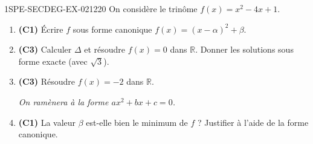 \begin{exercice}{1SPE-SECDEG-EX-021}{2}{20}
On considère le trinôme $f(x) = x^2 - 4x + 1$.

\begin{enumerate}
  \item \textbf{(C1)} Écrire $f$ sous forme canonique $f(x) = (x - \alpha)^2 + \beta$.
  \item \textbf{(C3)} Calculer $\Delta$ et résoudre $f(x) = 0$ dans $\mathbb{R}$. Donner les solutions sous forme exacte (avec $\sqrt{3}$).
  \item \textbf{(C3)} Résoudre $f(x) = -2$ dans $\mathbb{R}$.

  \textit{On ramènera à la forme $ax^2 + bx + c = 0$.}

  \item \textbf{(C1)} La valeur $\beta$ est-elle bien le minimum de $f$ ? Justifier à l'aide de la forme canonique.
\end{enumerate}
\end{exercice}
